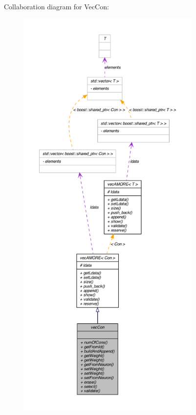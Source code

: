Collaboration diagram for VecCon:
\nopagebreak
\begin{figure}[H]
\begin{center}
\leavevmode
\includegraphics[height=600pt]{classvec_con__coll__graph}
\end{center}
\end{figure}
